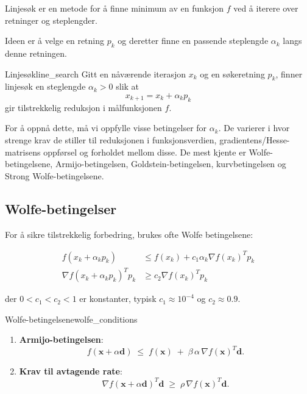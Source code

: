 Linjesøk er en metode for å finne minimum av en funksjon \(f\) ved å iterere over retninger og steplengder.

Ideen er å velge en retning \(p_k\) og deretter finne en passende steplengde \(\alpha_k\) langs denne retningen.

\begin{definition}{Linjesøk}{line_search}
  Gitt en nåværende iterasjon \(x_k\) og en søkeretning \(p_k\), finner linjesøk en steglengde \(\alpha_k > 0\) slik at
  \[
    x_{k+1} = x_k + \alpha_k p_k
  \]
  gir tilstrekkelig reduksjon i målfunksjonen \(f\).
\end{definition}

For å oppnå dette, må vi oppfylle visse betingelser for \(\alpha_k\).
De varierer i hvor strenge krav de stiller til reduksjonen i funksjonsverdien, gradientens/Hesse-matrisens oppførsel og forholdet mellom disse.
De mest kjente er Wolfe-betingelsene, Armijo-betingelsen, Goldstein-betingelsen, kurvbetingelsen og Strong Wolfe-betingelsene.

\subsection{Wolfe-betingelser}

For å sikre tilstrekkelig forbedring, brukes ofte Wolfe betingelsene:

\begin{align}
  f(x_k + \alpha_k p_k)              & \leq f(x_k) + c_1 \alpha_k \nabla f(x_k)^T p_k \tag{Armijo betingelse} \\
  \nabla f(x_k + \alpha_k p_k)^T p_k & \geq c_2 \nabla f(x_k)^T p_k \tag{Krumningsbetingelse}
\end{align}

der \(0 < c_1 < c_2 < 1\) er konstanter, typisk \(c_1 \approx 10^{-4}\) og \(c_2 \approx 0.9\).

\begin{definition}{Wolfe-betingelsene}{wolfe_conditions}
  \begin{enumerate}
    \item \textbf{Armijo-betingelsen}:
          \[
            f(\symbf{x} + \alpha \symbf{d})
            \;\le\;
            f(\symbf{x})
            \;+\;
            \beta\,\alpha\,\nabla f(\symbf{x})^T \symbf{d}.
          \]
    \item \textbf{Krav til avtagende rate}:
          \[
            \nabla f(\symbf{x} + \alpha \symbf{d})^T \symbf{d}
            \;\ge\;
            \rho \,\nabla f(\symbf{x})^T \symbf{d}.
          \]
  \end{enumerate}
\end{definition}

